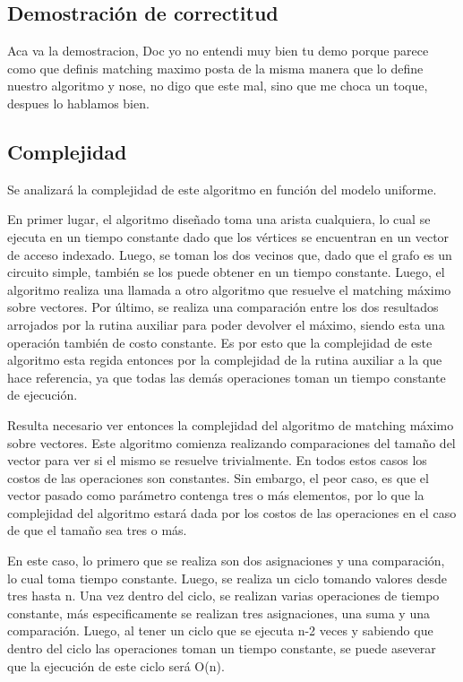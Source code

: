\documentclass[a4paper, 12pt]{article}
\begin{document}
\subsection*{Demostración de correctitud}

Aca va la demostracion, Doc yo no entendi muy bien tu demo porque parece como que definis matching maximo posta de la misma manera que lo define nuestro algoritmo y nose, no digo que este mal, sino que me choca un toque, despues lo hablamos bien.


\subsection*{Complejidad}
Se analizará la complejidad de este algoritmo en función del modelo uniforme.

En primer lugar, el algoritmo dise\~{n}ado toma una arista cualquiera, lo cual se ejecuta en un tiempo constante dado que los vértices se encuentran en un vector de acceso indexado. Luego, se toman los dos vecinos que, dado que el grafo es un circuito simple, también se los puede obtener en un tiempo constante. Luego, el algoritmo realiza una llamada a otro algoritmo que resuelve el matching máximo sobre vectores. Por último, se realiza una comparación entre los dos resultados arrojados por la rutina auxiliar para poder devolver el máximo, siendo esta una operación también de costo constante. Es por esto que la complejidad de este algoritmo esta regida entonces por la complejidad de la rutina auxiliar a la que hace referencia, ya que todas las demás operaciones toman un tiempo constante de ejecución.

Resulta necesario ver entonces la complejidad del algoritmo de matching máximo sobre vectores.
Este algoritmo comienza realizando comparaciones del tama\~{n}o del vector para ver si el mismo se resuelve trivialmente. En todos estos casos los costos de las operaciones son constantes. Sin embargo, el peor caso, es que el vector pasado como parámetro contenga tres o más elementos, por lo que la complejidad del algoritmo estará dada por los costos de las operaciones en el caso de que el tama\~{n}o sea tres o más.

En este caso, lo primero que se realiza son dos asignaciones y una comparación, lo cual toma tiempo constante. Luego, se realiza un ciclo tomando valores desde tres hasta n. Una vez dentro del ciclo, se realizan varias operaciones de tiempo constante, más especificamente se realizan tres asignaciones, una suma y una comparación. Luego, al tener un ciclo que se ejecuta n-2 veces y sabiendo que dentro del ciclo las operaciones toman un tiempo constante, se puede aseverar que la ejecución de este ciclo será O(n). 
\end{document}

